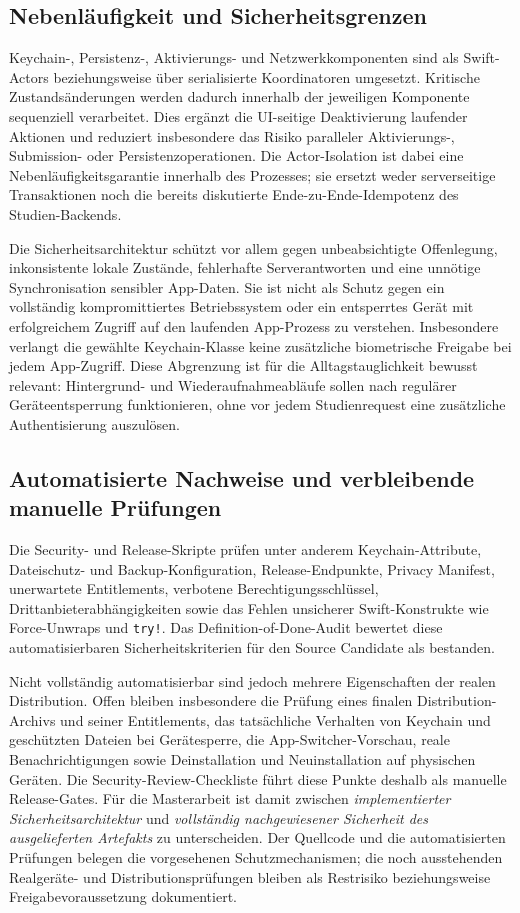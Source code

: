 \begin{neu}
\subsection{Nebenläufigkeit und Sicherheitsgrenzen}

Keychain-, Persistenz-, Aktivierungs- und Netzwerkkomponenten sind als Swift-Actors beziehungsweise über serialisierte Koordinatoren umgesetzt. Kritische Zustandsänderungen werden dadurch innerhalb der jeweiligen Komponente sequenziell verarbeitet. Dies ergänzt die UI-seitige Deaktivierung laufender Aktionen und reduziert insbesondere das Risiko paralleler Aktivierungs-, Submission- oder Persistenzoperationen. Die Actor-Isolation ist dabei eine Nebenläufigkeitsgarantie innerhalb des Prozesses; sie ersetzt weder serverseitige Transaktionen noch die bereits diskutierte Ende-zu-Ende-Idempotenz des Studien-Backends.

Die Sicherheitsarchitektur schützt vor allem gegen unbeabsichtigte Offenlegung, inkonsistente lokale Zustände, fehlerhafte Serverantworten und eine unnötige Synchronisation sensibler App-Daten. Sie ist nicht als Schutz gegen ein vollständig kompromittiertes Betriebssystem oder ein entsperrtes Gerät mit erfolgreichem Zugriff auf den laufenden App-Prozess zu verstehen. Insbesondere verlangt die gewählte Keychain-Klasse keine zusätzliche biometrische Freigabe bei jedem App-Zugriff. Diese Abgrenzung ist für die Alltagstauglichkeit bewusst relevant: Hintergrund- und Wiederaufnahmeabläufe sollen nach regulärer Geräteentsperrung funktionieren, ohne vor jedem Studienrequest eine zusätzliche Authentisierung auszulösen.

\subsection{Automatisierte Nachweise und verbleibende manuelle Prüfungen}

Die Security- und Release-Skripte prüfen unter anderem Keychain-Attribute, Dateischutz- und Backup-Konfiguration, Release-Endpunkte, Privacy Manifest, unerwartete Entitlements, verbotene Berechtigungsschlüssel, Drittanbieterabhängigkeiten sowie das Fehlen unsicherer Swift-Konstrukte wie Force-Unwraps und \texttt{try!}. Das Definition-of-Done-Audit bewertet diese automatisierbaren Sicherheitskriterien für den Source Candidate als bestanden.

Nicht vollständig automatisierbar sind jedoch mehrere Eigenschaften der realen Distribution. Offen bleiben insbesondere die Prüfung eines finalen Distribution-Archivs und seiner Entitlements, das tatsächliche Verhalten von Keychain und geschützten Dateien bei Gerätesperre, die App-Switcher-Vorschau, reale Benachrichtigungen sowie Deinstallation und Neuinstallation auf physischen Geräten. Die Security-Review-Checkliste führt diese Punkte deshalb als manuelle Release-Gates. Für die Masterarbeit ist damit zwischen \emph{implementierter Sicherheitsarchitektur} und \emph{vollständig nachgewiesener Sicherheit des ausgelieferten Artefakts} zu unterscheiden. Der Quellcode und die automatisierten Prüfungen belegen die vorgesehenen Schutzmechanismen; die noch ausstehenden Realgeräte- und Distributionsprüfungen bleiben als Restrisiko beziehungsweise Freigabevoraussetzung dokumentiert.
\end{neu}
